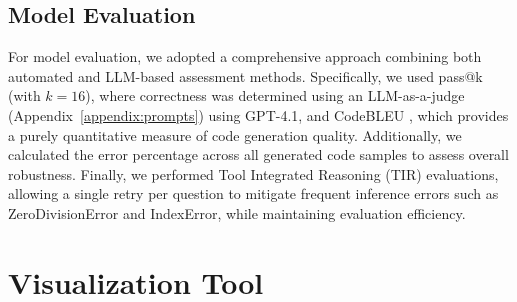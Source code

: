 \subsection{Model Evaluation}

For model evaluation, we adopted a comprehensive approach combining both automated and LLM-based assessment methods. Specifically, we used pass@k \cite{Levi2024SimpleModelInferenceScalingLaws} (with $k=16$), where correctness was determined using an LLM-as-a-judge \cite{Li2025LLMJudge} (Appendix~\ref{appendix:prompts}) using GPT-4.1, and CodeBLEU \cite{Ren2020CodeBLEU}, which provides a purely quantitative measure of code generation quality. Additionally, we calculated the error percentage across all generated code samples to assess overall robustness. Finally, we performed Tool Integrated Reasoning (TIR) \cite{Fleureau2024NuminaMath} evaluations, allowing a single retry per question to mitigate frequent inference errors such as ZeroDivisionError and IndexError, while maintaining evaluation efficiency.






\section{Visualization Tool}

